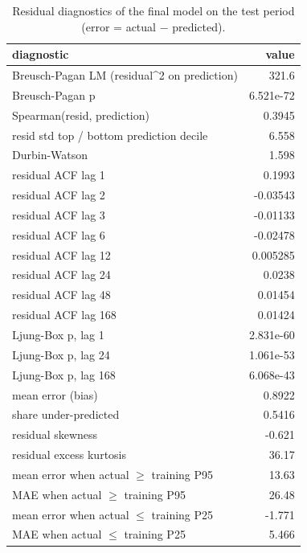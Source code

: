 \begin{table}[t]
\centering
\small
\caption{Residual diagnostics of the final model on the test period (error = actual $-$ predicted).}
\label{tab:table_S13_residual_diagnostics}
\begin{tabular}{lr}
\toprule
diagnostic & value \\
\midrule
Breusch-Pagan LM (residual\textasciicircum{}2 on prediction) & 321.6 \\
Breusch-Pagan p & 6.521e-72 \\
Spearman(\textbar{}resid\textbar{}, prediction) & 0.3945 \\
resid std top / bottom prediction decile & 6.558 \\
Durbin-Watson & 1.598 \\
residual ACF lag 1 & 0.1993 \\
residual ACF lag 2 & -0.03543 \\
residual ACF lag 3 & -0.01133 \\
residual ACF lag 6 & -0.02478 \\
residual ACF lag 12 & 0.005285 \\
residual ACF lag 24 & 0.0238 \\
residual ACF lag 48 & 0.01454 \\
residual ACF lag 168 & 0.01424 \\
Ljung-Box p, lag 1 & 2.831e-60 \\
Ljung-Box p, lag 24 & 1.061e-53 \\
Ljung-Box p, lag 168 & 6.068e-43 \\
mean error (bias) & 0.8922 \\
share under-predicted & 0.5416 \\
residual skewness & -0.621 \\
residual excess kurtosis & 36.17 \\
mean error when actual $\geq$ training P95 & 13.63 \\
MAE when actual $\geq$ training P95 & 26.48 \\
mean error when actual $\leq$ training P25 & -1.771 \\
MAE when actual $\leq$ training P25 & 5.466 \\
\bottomrule
\end{tabular}
\end{table}
